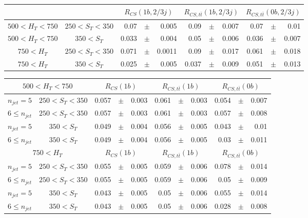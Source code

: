 \documentclass[12pt]{paper}
\begin{document}
\begin{table}[ht]
\begin{center}
\begin{tabular}{cc|rrr|rrr|rrr}
&&\multicolumn{3}{c|}{$R_{CS}(1b,2/3j)$}&\multicolumn{3}{c|}{$R_{CS,t\bar{t}}(1b,2/3j)$}&\multicolumn{3}{c}{$R_{CS,t\bar{t}}(0b,2/3j)$}\\\hline
$500< H_{T}< 750$ & $250< S_{T}< 350$ & 0.07&$\pm$&0.005 & 0.09&$\pm$&0.007 & 0.07&$\pm$&0.01\\
$500< H_{T}< 750$ & $350< S_{T}$ & 0.033&$\pm$&0.004 & 0.05&$\pm$&0.006 & 0.036&$\pm$&0.007\\
$750< H_{T}$ & $250< S_{T}< 350$ & 0.071&$\pm$&0.0011 & 0.09&$\pm$&0.017 & 0.061&$\pm$&0.018\\
$750< H_{T}$ & $350< S_{T}$ & 0.025&$\pm$&0.005 & 0.037&$\pm$&0.009 & 0.051&$\pm$&0.013\\
\end{tabular}
\end{center}
\end{table}


\begin{table}[ht]
\begin{center}
\begin{tabular}{cc|rrr|rrr|rrr}
\multicolumn{2}{c|}{$500< H_{T}< 750$}&\multicolumn{3}{c|}{$R_{CS}(1b)$}&\multicolumn{3}{c|}{$R_{CS,t\bar{t}}(1b)$}&\multicolumn{3}{c}{$R_{CS,t\bar{t}}(0b)$}\\\hline
$n_{jet}=5$ & $250< S_{T}< 350$ & 0.057&$\pm$&0.003 & 0.061&$\pm$&0.003 & 0.054&$\pm$&0.007\\
$6\leq n_{jet}$ & $250< S_{T}< 350$ & 0.057&$\pm$&0.003 & 0.061&$\pm$&0.003 & 0.057&$\pm$&0.008\\
$n_{jet}=5$ & $350< S_{T}$ & 0.049&$\pm$&0.004 & 0.056&$\pm$&0.005 & 0.043&$\pm$&0.01\\
$6\leq n_{jet}$ & $350< S_{T}$ & 0.049&$\pm$&0.004 & 0.056&$\pm$&0.005 & 0.03&$\pm$&0.011\\
\hline
\multicolumn{2}{c|}{$750< H_{T}$}&\multicolumn{3}{c|}{$R_{CS}(1b)$}&\multicolumn{3}{c|}{$R_{CS,t\bar{t}}(1b)$}&\multicolumn{3}{c}{$R_{CS,t\bar{t}}(0b)$}\\\hline
$n_{jet}=5$ & $250< S_{T}< 350$ & 0.055&$\pm$&0.005 & 0.059&$\pm$&0.006 & 0.078&$\pm$&0.014\\
$6\leq n_{jet}$ & $250< S_{T}< 350$ & 0.055&$\pm$&0.005 & 0.059&$\pm$&0.006 & 0.05&$\pm$&0.009\\
$n_{jet}=5$ & $350< S_{T}$ & 0.043&$\pm$&0.005 & 0.05&$\pm$&0.006 & 0.055&$\pm$&0.014\\
$6\leq n_{jet}$ & $350< S_{T}$ & 0.043&$\pm$&0.005 & 0.05&$\pm$&0.006 & 0.028&$\pm$&0.008\\
\end{tabular}
\end{center}
\end{table}
\end{document}
